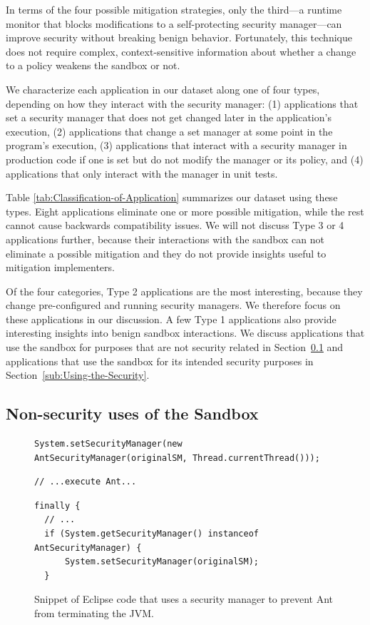 \documentclass{sig-alternate}
\begin{document}
In terms of the four possible mitigation strategies,
only the third---a runtime monitor that blocks modifications to a self-protecting security manager---can
improve security without breaking benign behavior. 
Fortunately, this technique does not require complex, context-sensitive
information about whether a change to a policy weakens the sandbox or not. 

We characterize each application in our dataset along one of four types, depending on how they
interact with the security manager:
(1) applications that set a
security manager that does not get changed later in the application's
execution, (2) applications that change a set manager at some point
in the program's execution, (3) applications that interact with a
security manager in production code if one is set but do not modify the manager
or its policy, and (4) applications
that only interact with the manager in unit tests. 

Table \ref{tab:Classification-of-Application}
summarizes our dataset using these types. Eight applications eliminate one or more possible mitigation, while the rest cannot cause backwards compatibility issues. We will
not discuss Type 3 or 4 applications further, because their interactions with
the sandbox can not eliminate a possible mitigation and they do not provide insights useful to mitigation implementers.  

Of the four categories, Type 2 applications are the most interesting, because
they change pre-configured and running security managers.  We therefore focus
on these applications in our discussion. A few Type 1
applications also provide interesting insights into
benign sandbox interactions. We discuss applications that use the sandbox for
purposes that are not security related in Section~\ref{sub:Non-security-uses-of}
and applications that use the sandbox for its intended security purposes in
Section~\ref{sub:Using-the-Security}.

\subsection{Non-security uses of the Sandbox}\label{sub:Non-security-uses-of}

\begin{figure}
\begin{lstlisting}[firstnumber=691]
System.setSecurityManager(new AntSecurityManager(originalSM, Thread.currentThread()));
\end{lstlisting}
\vspace{-0.3cm}
\begin{lstlisting}[firstnumber=703]
// ...execute Ant...
\end{lstlisting}
\vspace{-0.3cm}
\begin{lstlisting}[firstnumber=723]
finally {
  // ...
  if (System.getSecurityManager() instanceof AntSecurityManager) { 
      System.setSecurityManager(originalSM); 
  }
\end{lstlisting}\vspace{-0.3cm}
\caption{Snippet of Eclipse code that uses a security manager to prevent Ant\label{fig:Eclipse-snippet}
from terminating the JVM.}
\end{figure}
\end{document}
